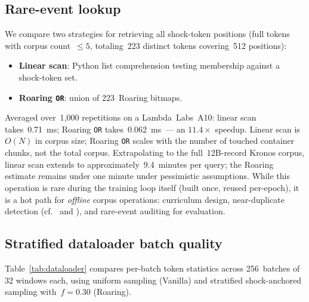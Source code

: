 \documentclass[10pt]{article}
\begin{document}
\subsection{Rare-event lookup}\label{sec:lookup}

We compare two strategies for retrieving all shock-token positions
(full tokens with corpus count~$\leq 5$, totaling~223 distinct tokens
covering~512 positions):
\begin{itemize}
\item \textbf{Linear scan}: Python list comprehension testing
membership against a shock-token set.
\item \textbf{Roaring \texttt{OR}}: union of 223~Roaring bitmaps.
\end{itemize}
Averaged over~1{,}000 repetitions on a Lambda~Labs~A10: linear scan
takes~0.71~ms; Roaring \texttt{OR} takes~0.062~ms~--- an
$11.4\times$ speedup. Linear scan is~$O(N)$ in corpus size; Roaring
\texttt{OR} scales with the number of touched container chunks, not
the total corpus. Extrapolating to the full~12B-record Kronos
corpus, linear scan extends to approximately~9.4~minutes per query;
the Roaring estimate remains under one minute under pessimistic
assumptions. While this operation is rare during the training loop
itself (built once, reused per-epoch), it is a hot path for
\emph{offline} corpus operations: curriculum design, near-duplicate
detection (cf.~\citet{lshbloom2024} and \citet{dolma2024}), and
rare-event auditing for evaluation.

\subsection{Stratified dataloader batch quality}\label{sec:batch-quality}

Table~\ref{tab:dataloader} compares per-batch token statistics across
256~batches of 32 windows each, using uniform sampling (Vanilla) and
stratified shock-anchored sampling with~$f=0.30$ (Roaring).
\end{document}
